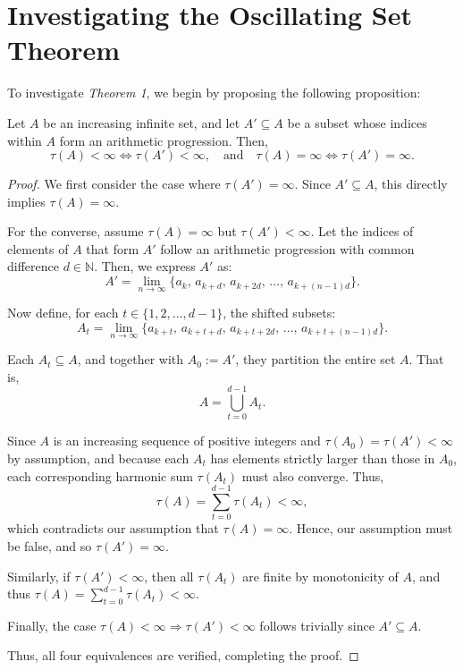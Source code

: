 \section{Investigating the Oscillating Set Theorem}

To investigate \emph{Theorem 1}, we begin by proposing the following proposition:

\begin{proposition}
Let $A$ be an increasing infinite set, and let $A' \subseteq A$ be a subset whose indices within $A$ form an arithmetic progression. Then,
\[
\tau(A) < \infty \iff \tau(A') < \infty, \quad \text{and} \quad \tau(A) = \infty \iff \tau(A') = \infty.
\]
\end{proposition}

\begin{proof}
We first consider the case where $\tau(A') = \infty$. Since $A' \subseteq A$, this directly implies $\tau(A) = \infty$.

For the converse, assume $\tau(A) = \infty$ but $\tau(A') < \infty$. Let the indices of elements of $A$ that form $A'$ follow an arithmetic progression with common difference $d \in \mathbb{N}$. Then, we express $A'$ as:
\[
A' = \lim_{n \to \infty} \{ a_k,\, a_{k+d},\, a_{k+2d},\, \dots,\, a_{k+(n-1)d} \}.
\]

Now define, for each $t \in \{1, 2, \dots, d-1\}$, the shifted subsets:
\[
A_t = \lim_{n \to \infty} \{ a_{k+t},\, a_{k+t+d},\, a_{k+t+2d},\, \dots,\, a_{k+t+(n-1)d} \}.
\]

Each $A_t \subseteq A$, and together with $A_0 := A'$, they partition the entire set $A$. That is,
\[
A = \bigcup_{t=0}^{d-1} A_t.
\]

Since $A$ is an increasing sequence of positive integers and $\tau(A_0) = \tau(A') < \infty$ by assumption, and because each $A_t$ has elements strictly larger than those in $A_0$, each corresponding harmonic sum $\tau(A_t)$ must also converge. Thus,
\[
\tau(A) = \sum_{t=0}^{d-1} \tau(A_t) < \infty,
\]
which contradicts our assumption that $\tau(A) = \infty$. Hence, our assumption must be false, and so $\tau(A') = \infty$.

Similarly, if $\tau(A') < \infty$, then all $\tau(A_t)$ are finite by monotonicity of $A$, and thus $\tau(A) = \sum_{t=0}^{d-1} \tau(A_t) < \infty$.

Finally, the case $\tau(A) < \infty \Rightarrow \tau(A') < \infty$ follows trivially since $A' \subseteq A$.

Thus, all four equivalences are verified, completing the proof.
\end{proof}

